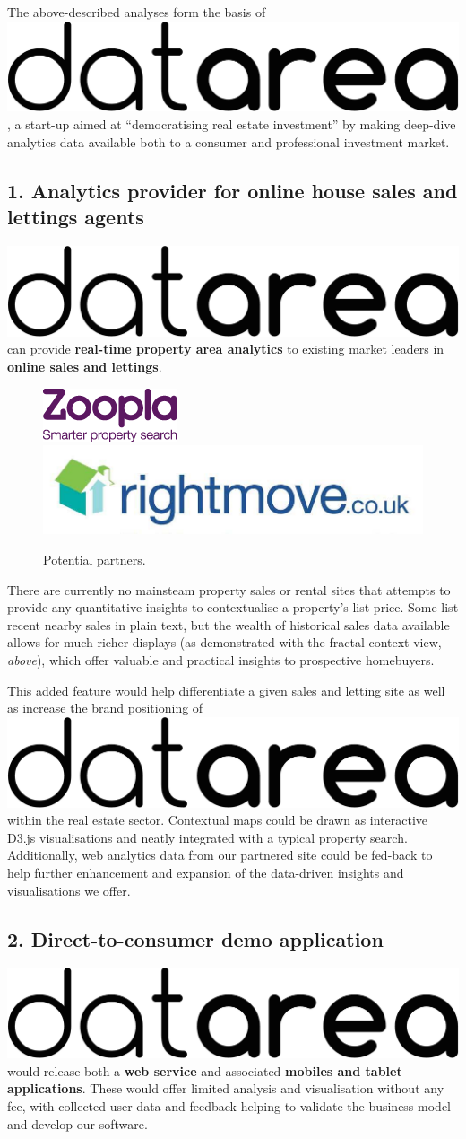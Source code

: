 \documentclass[
10pt, %
a4paper, %
oneside, %
headinclude,footinclude, %
BCOR5mm, %
]{scrartcl}
\newcommand*{\logo}{\includegraphics[scale=.04]{Figures/logotext.png}}
\begin{document}
The above-described analyses form the basis of \logo\hspace{.1em}, a
start-up aimed at ``democratising real estate investment'' by
making deep-dive analytics data available both to a consumer and
professional investment market.

\subsection*{1. Analytics provider for online house sales and lettings
agents}

\logo\hspace{.1em} can provide {\bf real-time property area analytics} to
existing market leaders in {\bf online sales and lettings}. 

\begin{figure}
\begin{center}
\includegraphics[width=.18\textwidth]{Figures/zoopla.png}
\includegraphics[width=.23\textwidth]{Figures/rightmove.jpg}
\caption*{ Potential partners. }
\end{center}
\end{figure}

There are currently no mainsteam property sales or rental sites that
attempts to provide any quantitative insights to contextualise a
property's list price. Some list recent nearby sales in plain text,
but the wealth of historical sales data available allows for much
richer displays (as demonstrated with the fractal context view,
\emph{above}), which offer valuable and practical insights to
prospective homebuyers.

This added feature would help differentiate a given sales and letting
site as well as increase the brand positioning of \logo\hspace{.1em}
within the real estate sector. Contextual maps could be drawn as
interactive D3.js visualisations and neatly integrated with a typical
property search. Additionally, web analytics data from our partnered
site could be fed-back to help further enhancement and expansion of
the data-driven insights and visualisations we offer.


\subsection*{2. Direct-to-consumer demo application}
\logo \hspace{.1em} would release both a {\bf web service} and associated
{\bf mobiles and tablet applications}. These would offer limited analysis and
visualisation without any fee, with collected user data and feedback helping to
validate the business model and develop our software.
\end{document}
